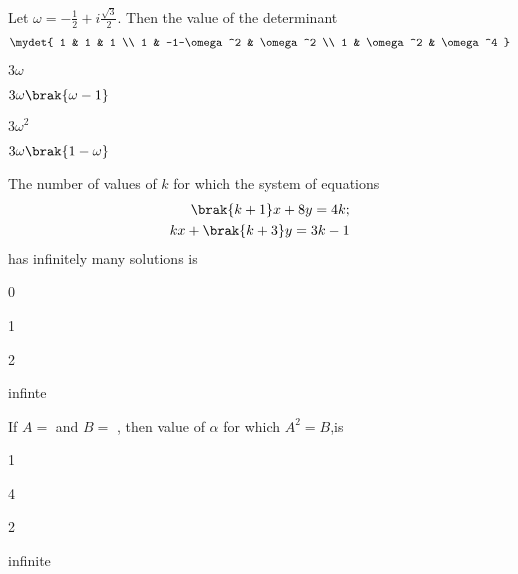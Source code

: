 \item Let $\omega = -\frac{1}{2} +i\frac{\sqrt{3}}{2}$. Then the value of the determinant \hfill{}
    \begin{align*}
        \mydet{
            1 & 1 & 1 \\
            1 & -1-\omega^2 & \omega^2 \\
            1 & \omega^2 & \omega^4 
        }
    \end{align*}
    \begin{enumerate}
            \begin{multicols}{2}
            \item $3\omega$ \columnbreak
            \item $3\omega\brak{\omega-1}$
            \end{multicols}
            \begin{multicols}{2}
            \item $3\omega^2$ \columnbreak
            \item $3\omega\brak{1-\omega}$
            \end{multicols}
    \end{enumerate}


\item The number of values of $k$ for which the system of equations 
    \begin{align*}
    \brak{k+1}x + 8y=4k; \\ kx +\brak{k+3}y=3k-1 \end{align*} has infinitely many solutions is 
    \hfill{}
    \begin{enumerate}
            \begin{multicols}{4}
            \item 0 \columnbreak
            \item 1 \columnbreak
            \item 2 \columnbreak
            \item infinte
            \end{multicols}
    \end{enumerate}

\item If $A=$
     and $B=$ , then value of $\alpha$ for which $A^2 = B$,is
    \hfill{}
    \begin{enumerate}
            \begin{multicols}{2}
            \item 1 \columnbreak
            \item 4 
            \end{multicols}
            \begin{multicols}{2}

            \item 2 \columnbreak
            \item infinite
            \end{multicols}
    \end{enumerate}


